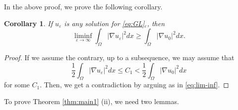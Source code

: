 \documentclass[a4paper,10pt,reqno]{amsart}
\newtheorem{corollary}[theorem]{Corollary}
\theoremstyle{definition}
\newcommand{\ve}{{\varepsilon}}
\newcommand{\Om}{{\Omega}}
\numberwithin{equation}{section}
\begin{document}
In the above proof, we prove the following corollary.

\smallskip
\begin{corollary}\label{cor:liminf}
If $u_\ve$ is any solution for  \eqref{eq:GL}$_\ve$, then
\[ \liminf_{\ve \to \infty} \int_\Om |\nabla u_\ve|^2  dx \ge  \int_\Om |\nabla u_0|^2  dx.
\]
\end{corollary}
%
\begin{proof}
If we assume the contrary, up to a subsequence, we may assume that
\[ \frac{1}{2} \int_\Omega |\nabla u_\ve|^2 dx \leq C_1 < \frac{1}{2} \int_\Omega |\nabla u_0|^2 dx
\]
for some $C_1$.
Then, we get a contradiction by arguing as in  \eqref{eq:lim-inf}.
\end{proof}
\smallskip

To prove Theorem \ref{thm:main1} (ii), we need two lemmas.
\end{document}
